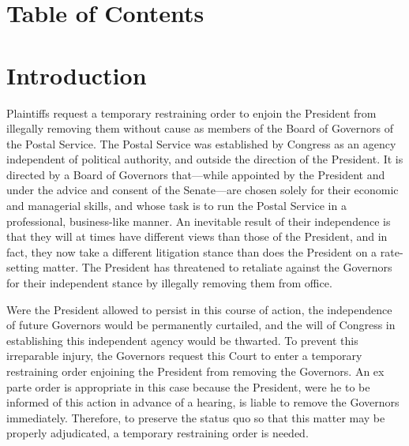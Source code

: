\documentclass[12pt,\documentclassflag]{lawbrief}
\begin{document}
\section*{Table of Contents}
\singlespacing
\tableofcontents \newpage

\begingroup
\tableofauthorities \newpage
\endgroup

\pagestyle{plain}

\section{Introduction}
\doublespacing


Plaintiffs request a temporary restraining order to enjoin the President from illegally removing them without cause as members of the Board of Governors of the Postal Service.  The Postal Service was established by Congress as an agency independent of political authority, and outside the direction of the President.  It is directed by a Board of Governors that---while appointed by the President and under the advice and consent of the Senate---are chosen solely for their economic and managerial skills, and whose task is to run the Postal Service in a professional, business-like manner.  An inevitable result of their independence is that they will at times have different views than those of the President, and in fact, they now take a different litigation stance than does the President on a rate-setting matter.  The President has threatened to retaliate against the Governors for their independent stance by illegally removing them from office.  

Were the President allowed to persist in this course of action, the independence of future Governors would be permanently curtailed, and the will of Congress in establishing this independent agency would be thwarted.  To prevent this irreparable injury, the Governors request this Court to enter a temporary restraining order enjoining the President from removing the Governors.  An ex parte order is appropriate in this case because the President, were he to be informed of this action in advance of a hearing, is liable to remove the Governors immediately. Therefore, to preserve the status quo so that this matter may be properly adjudicated, a temporary restraining order is needed.  
\end{document}
